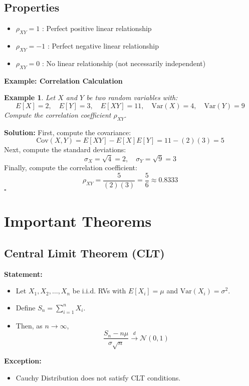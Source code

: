 \documentclass[12pt]{article}
\newtheorem{example}{Example}
\newenvironment{solution}{\noindent\textbf{Solution:}}{\hfill$\square$}
\begin{document}
\subsection{Properties}
\begin{itemize}
    \item \( \rho_{XY} = 1 \) : Perfect positive linear relationship
    \item \( \rho_{XY} = -1 \) : Perfect negative linear relationship
    \item \( \rho_{XY} = 0 \) : No linear relationship (not necessarily independent)
\end{itemize}

\textbf{Example: Correlation Calculation}
\begin{example}
Let \( X \) and \( Y \) be two random variables with:
\[
E[X] = 2, \quad E[Y] = 3, \quad E[XY] = 11, \quad \text{Var}(X) = 4, \quad \text{Var}(Y) = 9
\]
Compute the correlation coefficient \( \rho_{XY} \).
\end{example}
\begin{solution}
First, compute the covariance:
\[
\text{Cov}(X,Y) = E[XY] - E[X]E[Y] = 11 - (2)(3) = 5
\]
Next, compute the standard deviations:
\[
\sigma_X = \sqrt{4} = 2, \quad \sigma_Y = \sqrt{9} = 3
\]
Finally, compute the correlation coefficient:
\[
\rho_{XY} = \frac{5}{(2)(3)} = \frac{5}{6} \approx 0.8333
\]
\end{solution}

\section{Important Theorems}
\subsection{Central Limit Theorem (CLT)}
\textbf{Statement:}
\begin{itemize}
    \item Let \( X_1, X_2, \ldots, X_n \) be i.i.d. RVs with \( E[X_i] = \mu \) and \( \text{Var}(X_i) = \sigma^2 \).
    \item Define \( S_n = \sum_{i=1}^n X_i \).
    \item Then, as \( n \to \infty \),
    \[
    \frac{S_n - n\mu}{\sigma \sqrt{n}} \xrightarrow{d} \mathcal{N}(0,1)
    \]
\end{itemize}

\textbf{Exception:}
\begin{itemize}
    \item Cauchy Distribution does not satisfy CLT conditions.
\end{itemize}
\end{document}
